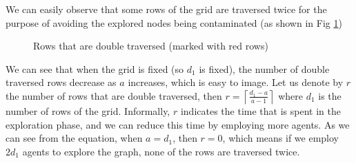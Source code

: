 We can easily observe that some rows of the grid are traversed twice for the purpose of avoiding the explored nodes being contaminated (as shown in Fig \ref{fig:doubleline})
\begin{figure} [H]
  \centering 
  \caption{Rows that are double traversed (marked with red rows)} 
  \label{fig:doubleline} %
\end{figure}
We can see that when the grid is fixed (so $d_1$ is fixed), the number of double traversed rows decrease as $a$ increases, which is easy to image. Let us denote by $r$ the number of rows that are double traversed, then $r=\left \lceil \frac{d_1-a}{a-1} \right \rceil$ where $d_1$ is the number of rows of the grid. Informally, $r$ indicates the time that is spent   in the exploration phase, and we can reduce this time by employing more agents. As we can see from the equation, when $a=d_1$, then $r=0$, which means if we employ $2d_1$ agents to explore the graph, none of the rows are traversed twice. \\

